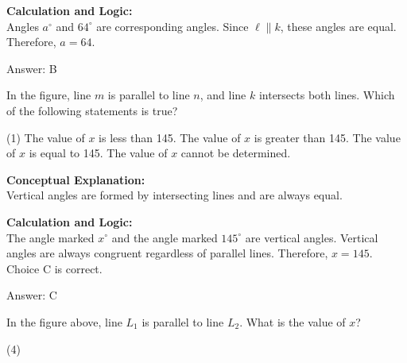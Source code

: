 \documentclass[11pt,paper=a4,answers]{exam}
\begin{document}
\begin{questions}
\begin{solution}
\textbf{Calculation and Logic:} \\
Angles $a^\circ$ and $64^\circ$ are corresponding angles. Since $\ell \parallel k$, these angles are equal. Therefore, $a = 64$.

\vspace{30pt}

Answer: \colorbox{yellow!100}{B}
\end{solution}

\vspace{60pt}

\question
\begin{center}
\end{center}
In the figure, line $m$ is parallel to line $n$, and line $k$ intersects both lines. Which of the following statements is true?
\begin{tasks}(1)
    \task The value of $x$ is less than 145.
    \task The value of $x$ is greater than 145.
    \task The value of $x$ is equal to 145.
    \task The value of $x$ cannot be determined.
\end{tasks}

\begin{solution}
\textbf{Conceptual Explanation:} \\
Vertical angles are formed by intersecting lines and are always equal.

\vspace{30pt}

\textbf{Calculation and Logic:} \\
The angle marked $x^\circ$ and the angle marked $145^\circ$ are vertical angles. Vertical angles are always congruent regardless of parallel lines. Therefore, $x = 145$. Choice C is correct.

\vspace{30pt}

Answer: \colorbox{yellow!100}{C}
\end{solution}

\question
\begin{center}
\end{center}
In the figure above, line $L_1$ is parallel to line $L_2$. What is the value of $x$?
\begin{tasks}(4)
\end{tasks}


\end{questions}
\end{document}
